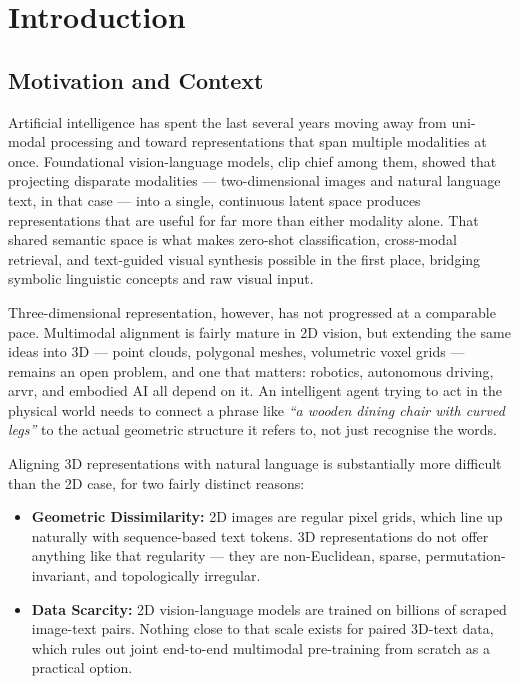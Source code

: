 \chapter{Introduction}
\label{ch:introduction}

\section{Motivation and Context}
\label{sec:motivation}

Artificial intelligence has spent the last several years moving away from uni-modal processing and toward representations that span multiple modalities at once. Foundational vision-language models, \gls{clip} chief among them, showed that projecting disparate modalities --- two-dimensional images and natural language text, in that case --- into a single, continuous latent space produces representations that are useful for far more than either modality alone. That shared semantic space is what makes zero-shot classification, cross-modal retrieval, and text-guided visual synthesis possible in the first place, bridging symbolic linguistic concepts and raw visual input.

Three-dimensional representation, however, has not progressed at a comparable pace. Multimodal alignment is fairly mature in 2D vision, but extending the same ideas into 3D --- point clouds, polygonal meshes, volumetric voxel grids --- remains an open problem, and one that matters: robotics, autonomous driving, \gls{arvr}, and embodied AI all depend on it. An intelligent agent trying to act in the physical world needs to connect a phrase like \emph{``a wooden dining chair with curved legs''} to the actual geometric structure it refers to, not just recognise the words.

Aligning 3D representations with natural language is substantially more difficult than the 2D case, for two fairly distinct reasons:
\begin{itemize}
    \item \textbf{Geometric Dissimilarity:} 2D images are regular pixel grids, which line up naturally with sequence-based text tokens. 3D representations do not offer anything like that regularity --- they are non-Euclidean, sparse, permutation-invariant, and topologically irregular.
    \item \textbf{Data Scarcity:} 2D vision-language models are trained on billions of scraped image-text pairs. Nothing close to that scale exists for paired 3D-text data, which rules out joint end-to-end multimodal pre-training from scratch as a practical option.
\end{itemize}


